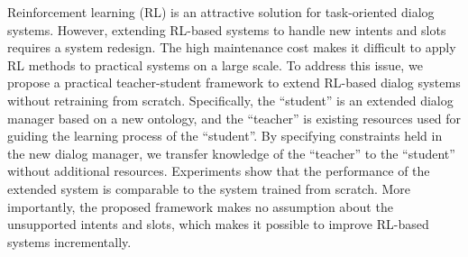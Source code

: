Reinforcement learning (RL) is an attractive solution for task-oriented dialog systems. However, extending RL-based systems to handle new intents and slots requires a system redesign. The high maintenance cost makes it difficult to apply RL methods to practical systems on a large scale. To address this issue, we propose a practical teacher-student framework to extend RL-based dialog systems without retraining from scratch. Specifically, the ``student'' is an extended dialog manager based on a new ontology, and the ``teacher'' is existing resources used for guiding the learning process of the ``student''. By specifying constraints held in the new dialog manager, we transfer knowledge of the ``teacher'' to the ``student'' without additional resources. Experiments show that the performance of the extended system is comparable to the system trained from scratch.  More importantly, the proposed framework makes no assumption about the unsupported intents and slots, which makes it possible to improve RL-based systems incrementally.

